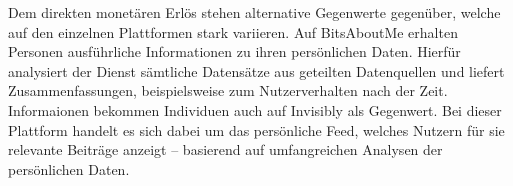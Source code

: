\noindent Dem direkten monetären Erlös stehen alternative Gegenwerte gegenüber, welche auf den einzelnen Plattformen stark variieren. Auf BitsAboutMe erhalten Personen ausführliche Informationen zu ihren persönlichen Daten. Hierfür analysiert der Dienst sämtliche Datensätze aus geteilten Datenquellen und liefert Zusammenfassungen, beispielsweise zum Nutzerverhalten nach der Zeit. Informaionen bekommen Individuen auch auf Invisibly als Gegenwert. Bei dieser Plattform handelt es sich dabei um das persönliche Feed, welches Nutzern für sie relevante Beiträge anzeigt -- basierend auf umfangreichen Analysen der persönlichen Daten. \newline


